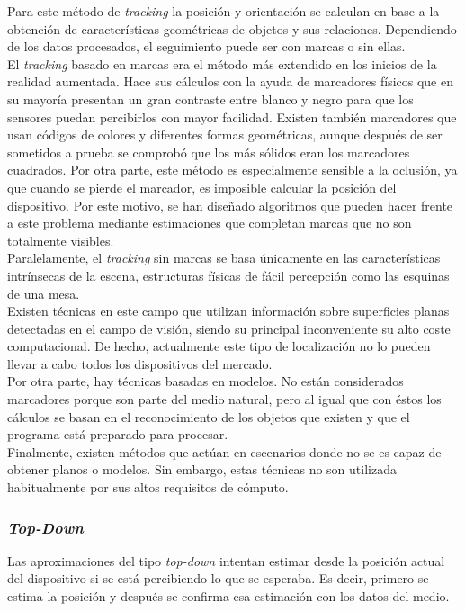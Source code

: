 Para este método de \textit{tracking} la posición y orientación se calculan en base a la obtención de características geométricas de objetos y sus relaciones. Dependiendo de los datos procesados, el seguimiento puede ser con marcas o sin ellas.\\

El \textit{tracking} basado en marcas era el método más extendido en los inicios de la realidad aumentada. Hace sus cálculos con la ayuda de marcadores físicos que en su mayoría presentan un gran contraste entre blanco y negro para que los sensores puedan percibirlos con mayor facilidad. Existen también marcadores que usan códigos de colores y diferentes formas geométricas, aunque después de ser sometidos a prueba se comprobó que los más sólidos eran los marcadores cuadrados. Por otra parte, este método es especialmente sensible a la oclusión, ya que cuando se pierde el marcador, es imposible calcular la posición del dispositivo. Por este motivo, se han diseñado algoritmos que pueden hacer frente a este problema mediante estimaciones que completan marcas que no son totalmente visibles.\\

Paralelamente, el \textit{tracking} sin marcas se basa únicamente en las características intrínsecas de la escena, estructuras físicas de fácil percepción como las esquinas de una mesa.\\

Existen técnicas en este campo que utilizan información sobre superficies planas detectadas en el campo de visión, siendo su principal inconveniente su alto coste computacional. De hecho, actualmente este tipo de localización no lo pueden llevar a cabo todos los dispositivos del mercado.\\

Por otra parte, hay técnicas basadas en modelos. No están considerados marcadores porque son parte del medio natural, pero al igual que con éstos los cálculos se basan en el reconocimiento de los objetos que existen y que el programa está preparado para procesar.\\

Finalmente, existen métodos que actúan en escenarios donde no se es capaz de obtener planos o modelos. Sin embargo, estas técnicas no son utilizada habitualmente por sus altos requisitos de cómputo.\\

\subsubsection{\textit{Top-Down}}
Las aproximaciones del tipo \textit{top-down} intentan estimar desde la posición actual del dispositivo si se está percibiendo lo que se esperaba. Es decir, primero se estima la posición y después se confirma esa estimación con los datos del medio.\\

